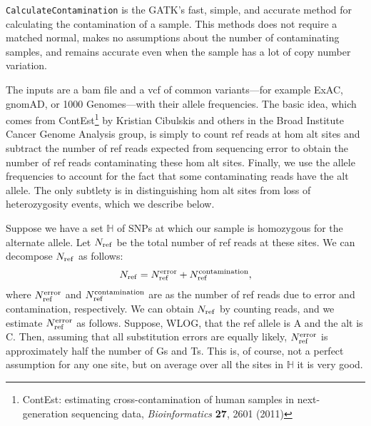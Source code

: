 \documentclass[nofootinbib,amssymb,amsmath]{revtex4}
\newcommand{\code}[1]{\texttt{#1}}
\begin{document}
\code{CalculateContamination} is the GATK's fast, simple, and accurate method for calculating the contamination of a sample.  This methods does not require a matched normal, makes no assumptions about the number of contaminating samples, and remains accurate even when the sample has a lot of copy number variation.

The inputs are a bam file and a vcf of common variants---for example ExAC, gnomAD, or 1000 Genomes---with their allele frequencies.  The basic idea, which comes from ContEst\footnote{ContEst: estimating cross-contamination of human samples in next-generation sequencing data, \textit{Bioinformatics} \textbf{27}, 2601 (2011)} by Kristian Cibulskis and others in the Broad Institute Cancer Genome Analysis group, is simply to count ref reads at hom alt sites and subtract the number of ref reads expected from sequencing error to obtain the number of ref reads contaminating these hom alt sites.  Finally, we use the allele frequencies to account for the fact that some contaminating reads have the alt allele.  The only subtlety is in distinguishing hom alt sites from loss of heterozygosity events, which we describe below.

Suppose we have a set $\mathbb{H}$ of SNPs at which our sample is homozygous for the alternate allele.  Let $N_{\rm ref}$ be the total number of ref reads at these sites.  We can decompose $N_{\rm ref}$ as follows:
\begin{align}
N_{\rm ref} = N_{\rm ref}^{\rm error} + N_{\rm ref}^{\rm contamination}, \label{decomposition}
\end{align}
where $N_{\rm ref}^{\rm error}$  and $N_{\rm ref}^{\rm contamination}$ are as the number of ref reads due to error and contamination, respectively.  We can obtain $N_{\rm ref}$ by counting reads, and we estimate $N_{\rm ref}^{\rm error}$ as follows.  Suppose, WLOG, that the ref allele is A and the alt is C.  Then, assuming that all substitution errors are equally likely, $N_{\rm ref}^{\rm error}$ is approximately half the number of Gs and Ts.  This is, of course, not a perfect assumption for any one site, but on average over all the sites in $\mathbb{H}$ it is very good.
\end{document}
